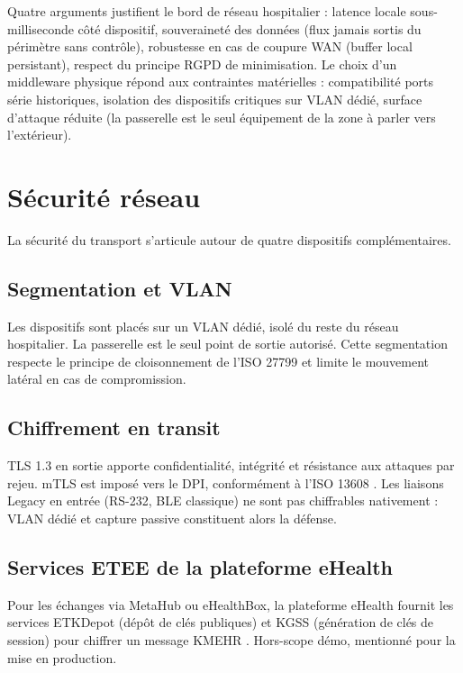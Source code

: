 Quatre arguments justifient le bord de réseau hospitalier : latence locale sous-milliseconde côté dispositif, souveraineté des données (flux jamais sortis du périmètre sans contrôle), robustesse en cas de coupure WAN (buffer local persistant), respect du principe RGPD de minimisation. Le choix d'un middleware physique répond aux contraintes matérielles : compatibilité ports série historiques, isolation des dispositifs critiques sur VLAN dédié, surface d'attaque réduite (la passerelle est le seul équipement de la zone à parler vers l'extérieur).

\section{Sécurité réseau}
\label{sec:secu-reseau}

La sécurité du transport s'articule autour de quatre dispositifs complémentaires.

\subsection{Segmentation et VLAN}

Les dispositifs sont placés sur un VLAN dédié, isolé du reste du réseau hospitalier. La passerelle est le seul point de sortie autorisé. Cette segmentation respecte le principe de cloisonnement de l'ISO 27799 \cite{iso_27799} et limite le mouvement latéral en cas de compromission.

\subsection{Chiffrement en transit}

TLS 1.3 en sortie apporte confidentialité, intégrité et résistance aux attaques par rejeu. mTLS est imposé vers le DPI, conformément à l'ISO 13608 \cite{iso_13608}. Les liaisons Legacy en entrée (RS-232, BLE classique) ne sont pas chiffrables nativement : VLAN dédié et capture passive constituent alors la défense.

\subsection{Services ETEE de la plateforme eHealth}

Pour les échanges via MetaHub ou eHealthBox, la plateforme eHealth fournit les services ETKDepot (dépôt de clés publiques) et KGSS (génération de clés de session) pour chiffrer un message KMEHR \cite{ehealth_services_base}. Hors-scope démo, mentionné pour la mise en production.

